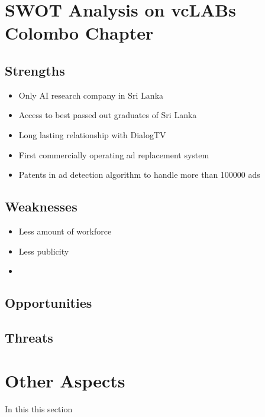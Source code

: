 \section{SWOT Analysis on vcLABs Colombo Chapter}
\subsection{Strengths}
\begin{itemize}
\item Only AI research company in Sri Lanka
\item Access to best passed out graduates of Sri Lanka
\item Long lasting relationship with DialogTV
\item First commercially operating ad replacement system
\item Patents in ad detection algorithm to handle more than 100000 ads
\end{itemize}
\subsection{Weaknesses}
\begin{itemize}
\item Less amount of workforce
\item Less publicity
\
\item 
\end{itemize}
\subsection{Opportunities}
\subsection{Threats}
\section{Other Aspects}
In this this section 